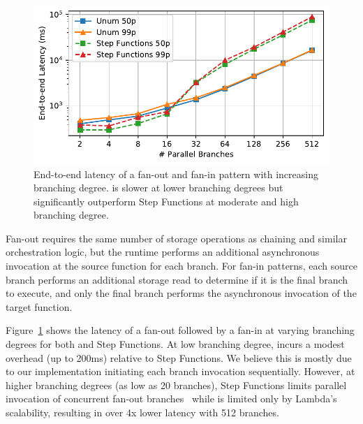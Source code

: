 
\begin{figure}[t]
  \centering
  \includegraphics[width=\columnwidth]{figures/MapMicroLatency.pdf}
  \caption{End-to-end latency of a fan-out and fan-in pattern with increasing
branching degree. \name{} is slower at lower branching degrees but significantly
outperform Step Functions at moderate and high branching degree.}
  \label{fig:mapmicrolatency}
\end{figure}

Fan-out requires the same number of storage operations as chaining and similar
orchestration logic, but the \name{} runtime performs an additional asynchronous
invocation at the source function for each branch. For fan-in patterns, each
source branch performs an additional storage read to determine if it is the
final branch to execute, and only the final branch performs the asynchronous
invocation of the target function.


Figure~\ref{fig:mapmicrolatency} shows the latency of a fan-out followed by a
fan-in at varying branching degrees for both \name{} and Step Functions. At
low branching degree, \name{} incurs a modest overhead (up to 200ms) relative
to Step Functions. We believe this is mostly due to our implementation
initiating each branch invocation sequentially. However, at higher branching degrees (as low as 20 branches), Step
Functions limits parallel invocation of concurrent fan-out
branches~\cite{aws-step-functions-map-state} while \name{} is limited only by
Lambda's scalability, resulting in over 4x lower latency with 512 branches.

